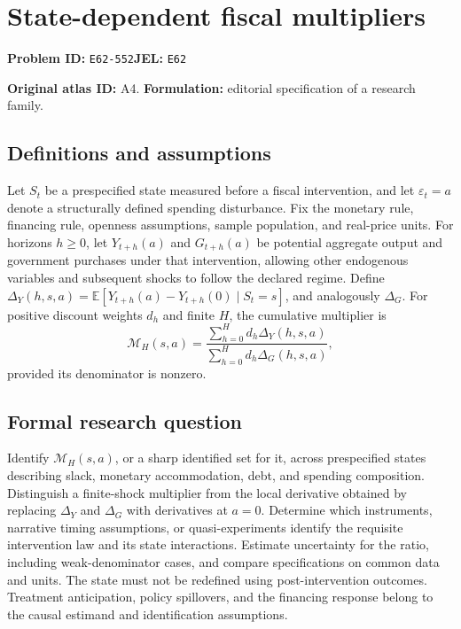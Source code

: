 \documentclass[11pt,a4paper]{article}
\begin{document}
\section*{State-dependent fiscal multipliers}
\textbf{Problem ID:} \texttt{E62-552}\quad \textbf{JEL:} \texttt{E62}\par
\label{problem:OP-0014}
\label{atlas:prob:A4}

\noindent\textbf{Original atlas ID:} A4. \textbf{Formulation:} editorial specification of a research family.

\subsection*{Definitions and assumptions}

Let $S_t$ be a prespecified state measured before a fiscal intervention, and let $\varepsilon_t=a$ denote a structurally defined spending disturbance. Fix the monetary rule, financing rule, openness assumptions, sample population, and real-price units. For horizons $h\ge0$, let $Y_{t+h}(a)$ and $G_{t+h}(a)$ be potential aggregate output and government purchases under that intervention, allowing other endogenous variables and subsequent shocks to follow the declared regime. Define $\Delta_Y(h,s,a)=\mathbb E[Y_{t+h}(a)-Y_{t+h}(0)\mid S_t=s]$, and analogously $\Delta_G$. For positive discount weights $d_h$ and finite $H$, the cumulative multiplier is
\[
\mathcal M_H(s,a)=\frac{\sum_{h=0}^Hd_h\Delta_Y(h,s,a)}
 {\sum_{h=0}^Hd_h\Delta_G(h,s,a)},
\]
provided its denominator is nonzero.

\subsection*{Formal research question}

Identify $\mathcal M_H(s,a)$, or a sharp identified set for it, across prespecified states describing slack, monetary accommodation, debt, and spending composition. Distinguish a finite-shock multiplier from the local derivative obtained by replacing $\Delta_Y$ and $\Delta_G$ with derivatives at $a=0$. Determine which instruments, narrative timing assumptions, or quasi-experiments identify the requisite intervention law and its state interactions. Estimate uncertainty for the ratio, including weak-denominator cases, and compare specifications on common data and units. The state must not be redefined using post-intervention outcomes. Treatment anticipation, policy spillovers, and the financing response belong to the causal estimand and identification assumptions.
\end{document}
